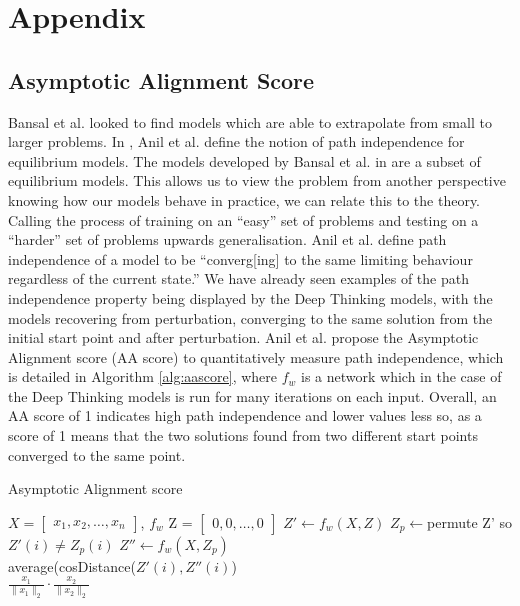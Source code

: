 
\appendix
\section{Appendix}
\subsection{Asymptotic Alignment Score}

Bansal et al. looked to find models which are able to extrapolate from small to larger problems. In \cite{anil2022path}, Anil et al. define the notion of path independence for equilibrium models. The models developed by Bansal et al. in \cite{bansal2022endtoend} are a subset of equilibrium models. This allows us to view the problem from another perspective knowing how our models behave in practice, we can relate this to the theory. Calling the process of training on an ``easy'' set of problems and testing on a ``harder'' set of problems upwards generalisation. Anil et al. define path independence of a model to be ``converg[ing] to the same limiting behaviour regardless of the current state.'' 
We have already seen examples of the path independence property being displayed by the Deep Thinking models, with the models recovering from perturbation, converging to the same solution from the initial start point and after perturbation. Anil et al. propose the Asymptotic Alignment score (AA score) to quantitatively measure path independence, which is detailed in Algorithm \ref{alg:aascore}, where $f_w$ is a network which in the case of the Deep Thinking models is run for many iterations on each input. Overall, an AA score of 1 indicates high path independence and lower values less so, as a score of 1 means that the two solutions found from two different start points converged to the same point.

\algrenewcommand{}
\algrenewcommand{}
\begin{algorithm}[h]
\caption{Asymptotic Alignment score}\label{alg:aascore}
\begin{algorithmic}
\Require $X=\begin{bmatrix} x_{1}, x_{2},\hdots,x_{n}\end{bmatrix}$, $f_w$
\State Z = $\begin{bmatrix} 0, 0,\hdots,0\end{bmatrix}$ 
\State $Z' \gets f_w(X,Z)$ 
\State $Z_p \gets $permute \; Z' \;so \;$Z'(i) \neq Z_p(i)$
\State $Z'' \gets f_w(X,Z_p)$\\
\Return average(cosDistance($Z'(i),Z''(i)$) 
\vspace{10pt}
\\
 \hspace*{\algorithmicindent}\Return $\frac{x_1}{\|x_1\|_2}\cdot \frac{x_2}{\|x_2\|_2}$
\EndProcedure
\end{algorithmic}
\end{algorithm}

